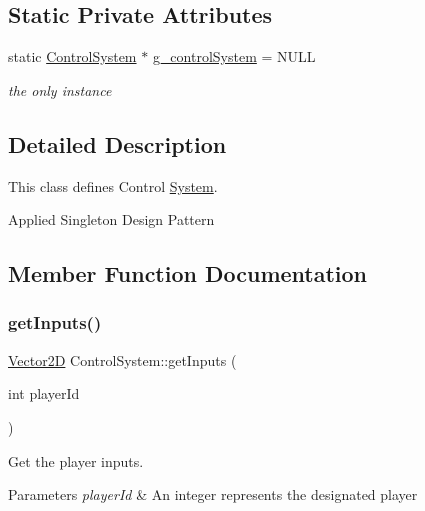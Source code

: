 \subsection*{Static Private Attributes}
\begin{DoxyCompactItemize}
\item 
\mbox{\label{class_control_system_a01a977c053a3cfab384a6d158cf34889}} 
static \mbox{\hyperlink{class_control_system}{Control\+System}} $\ast$ \mbox{\hyperlink{class_control_system_a01a977c053a3cfab384a6d158cf34889}{g\+\_\+control\+System}} = N\+U\+LL
\begin{DoxyCompactList}\small\item\em the only instance \end{DoxyCompactList}\end{DoxyCompactItemize}


\subsection{Detailed Description}
This class defines Control \mbox{\hyperlink{class_system}{System}}. 

Applied Singleton Design Pattern 

\subsection{Member Function Documentation}
\mbox{\label{class_control_system_ac3cb7e3272ab77ad22d47b157e4cc902}} 
\subsubsection{\texorpdfstring{get\+Inputs()}{getInputs()}}
{\footnotesize\ttfamily \mbox{\hyperlink{struct_vector2_d}{Vector2D}} Control\+System\+::get\+Inputs (\begin{DoxyParamCaption}\item[{int}]{player\+Id }\end{DoxyParamCaption})}



Get the player inputs. 


\begin{DoxyParams}{Parameters}
{\em player\+Id} & An integer represents the designated player \\
\hline
\end{DoxyParams}
\mbox{\label{class_control_system_aaa4401e75f3530060fe41c52115bb7f5}} 
